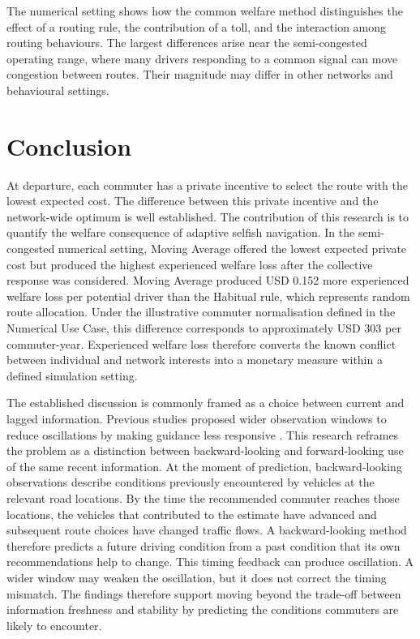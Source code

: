 \documentclass{article}
\begin{document}
The numerical setting shows how the common welfare method distinguishes the effect of a routing rule, the contribution of a toll, and the interaction among routing behaviours. The largest differences arise near the semi-congested operating range, where many drivers responding to a common signal can move congestion between routes. Their magnitude may differ in other networks and behavioural settings.

\clearpage
\section{Conclusion}

At departure, each commuter has a private incentive to select the route with the lowest expected cost. The difference between this private incentive and the network-wide optimum is well established. The contribution of this research is to quantify the welfare consequence of adaptive selfish navigation. In the semi-congested numerical setting, Moving Average offered the lowest expected private cost but produced the highest experienced welfare loss after the collective response was considered. Moving Average produced USD 0.152 more experienced welfare loss per potential driver than the Habitual rule, which represents random route allocation. Under the illustrative commuter normalisation defined in the Numerical Use Case, this difference corresponds to approximately USD 303 per commuter-year. Experienced welfare loss therefore converts the known conflict between individual and network interests into a monetary measure within a defined simulation setting.

The established discussion is commonly framed as a choice between current and lagged information. Previous studies proposed wider observation windows to reduce oscillations by making guidance less responsive \parencite{wahleEtAl2002,krallEtAl2021}. This research reframes the problem as a distinction between backward-looking and forward-looking use of the same recent information. At the moment of prediction, backward-looking observations describe conditions previously encountered by vehicles at the relevant road locations. By the time the recommended commuter reaches those locations, the vehicles that contributed to the estimate have advanced and subsequent route choices have changed traffic flows. A backward-looking method therefore predicts a future driving condition from a past condition that its own recommendations help to change. This timing feedback can produce oscillation. A wider window may weaken the oscillation, but it does not correct the timing mismatch. The findings therefore support moving beyond the trade-off between information freshness and stability by predicting the conditions commuters are likely to encounter.
\end{document}

